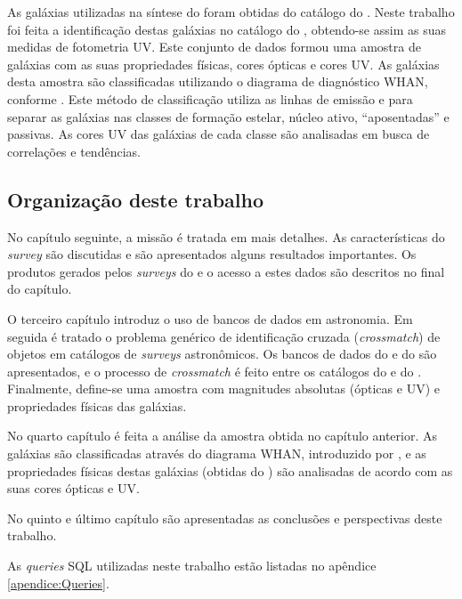 As galáxias utilizadas na síntese do \starlight foram obtidas do catálogo do
\SDSS. Neste trabalho foi feita a identificação destas galáxias no catálogo do
\galex, obtendo-se assim as suas medidas de fotometria UV. Este conjunto de
dados formou uma amostra de galáxias com as suas propriedades físicas, cores
ópticas e cores UV. As galáxias desta amostra são classificadas utilizando o
diagrama de diagnóstico WHAN, conforme \citet{CidFernandes2011}. Este método de
classificação utiliza as linhas de emissão \Halpha e \NII para separar as
galáxias nas classes de formação estelar, núcleo ativo, ``aposentadas'' e
passivas. As cores UV das galáxias de cada classe são analisadas em busca de
correlações e tendências.

\subsection{Organização deste trabalho}

No capítulo seguinte, a missão \galex é tratada em mais detalhes. As
características do {\em survey} são discutidas e são apresentados alguns
resultados importantes. Os produtos gerados pelos {\em surveys} do \galex e o
acesso a estes dados são descritos no final do capítulo.

O terceiro capítulo introduz o uso de bancos de dados em astronomia. Em seguida
é tratado o problema genérico de identificação cruzada ({\em crossmatch}) de
objetos em catálogos de {\em surveys} astronômicos. Os bancos de dados do \SDSS
e do \starlight são apresentados, e o processo de {\em crossmatch} é feito entre
os catálogos do \SDSS e do \galex. Finalmente, define-se uma amostra com
magnitudes absolutas (ópticas e UV) e propriedades físicas das galáxias.

No quarto capítulo é feita a análise da amostra obtida no capítulo anterior. As
galáxias são classificadas através do diagrama WHAN, introduzido por
\citet{CidFernandes2010, CidFernandes2011}, e as propriedades físicas destas
galáxias (obtidas do \starlight) são analisadas de acordo com as suas cores
ópticas e UV.

No quinto e último capítulo são apresentadas as conclusões e perspectivas deste
trabalho.

As {\em queries} SQL utilizadas neste trabalho estão listadas no apêndice
\ref{apendice:Queries}.

